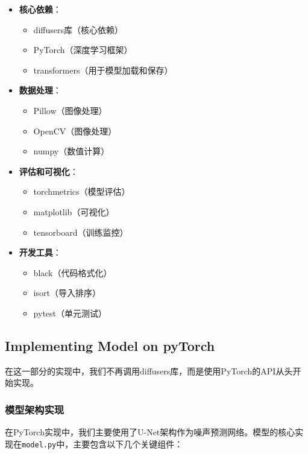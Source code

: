\documentclass{ctexart}
\begin{document}
\begin{itemize}
    \item \textbf{核心依赖}：
    \begin{itemize}
        \item diffusers库（核心依赖）
        \item PyTorch（深度学习框架）
        \item transformers（用于模型加载和保存）
    \end{itemize}
    
    \item \textbf{数据处理}：
    \begin{itemize}
        \item Pillow（图像处理）
        \item OpenCV（图像处理）
        \item numpy（数值计算）
    \end{itemize}
    
    \item \textbf{评估和可视化}：
    \begin{itemize}
        \item torchmetrics（模型评估）
        \item matplotlib（可视化）
        \item tensorboard（训练监控）
    \end{itemize}
    
    \item \textbf{开发工具}：
    \begin{itemize}
        \item black（代码格式化）
        \item isort（导入排序）
        \item pytest（单元测试）
    \end{itemize}
\end{itemize}

\subsection{Implementing Model on pyTorch}
\noindent
在这一部分的实现中，我们不再调用diffusers库，而是使用PyTorch的API从头开始实现。

\subsubsection{模型架构实现}
\noindent
在PyTorch实现中，我们主要使用了U-Net架构作为噪声预测网络。模型的核心实现在\texttt{model.py}中，主要包含以下几个关键组件：
\end{document}
